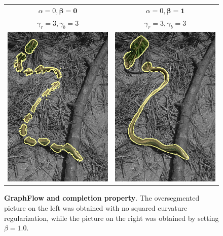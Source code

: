 \documentclass[runningheads]{llncs}
\begin{document}
\begin{figure}
\center
\begin{tabular}{cc}
$\alpha=0, \boldsymbol{\beta=0}$ & $\alpha=0, \boldsymbol{\beta=1}$\\
$\gamma_r = 3, \gamma_b = 3$ & $\gamma_r = 3, \gamma_b = 3$\\
 	\includegraphics[scale=0.35]{figures/completion/graphseg/alpha-0.0/beta-0.0/gamma-3.0/radius-7/corrected-seg.png} & 
 	\includegraphics[scale=0.35]{figures/completion/graphseg/alpha-0.0/beta-1.0/gamma-3.0/radius-7/corrected-seg.png}
\end{tabular}	
\caption{\textbf{GraphFlow and completion property}. The oversegmented picture on the left was obtained with no squared curvature regularization, while the picture on the right was obtained by setting $\beta=1.0$. }
\label{ch8:fig:segmentation-curvature-completion}
\end{figure}
\end{document}
